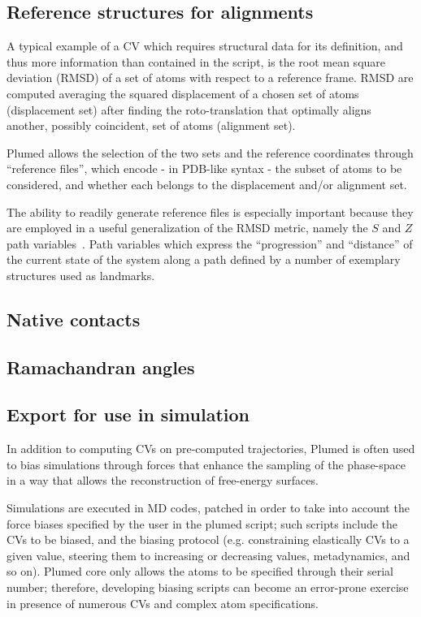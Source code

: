 \documentclass[preprint,12pt]{elsarticle}
\begin{document}
\subsection{Reference structures for alignments}

A typical example of a CV which requires structural data for its
definition, and thus more information than contained in the script, is
the root mean square deviation (RMSD) of a set of atoms with respect
to a reference frame. RMSD are computed averaging the squared
displacement of a chosen set of atoms (displacement set) after finding
the roto-translation that optimally aligns another, possibly
coincident, set of atoms (alignment set). 

Plumed allows the selection of the two sets and the reference
coordinates through ``reference files'', which encode - in PDB-like
syntax - the subset of atoms to be considered, and whether each
belongs to the displacement and/or alignment set. 

The ability to readily generate reference files is especially
important because they are employed in a useful generalization of the
RMSD metric, namely the $S$ and $Z$ path
variables~\cite{Branduardi_Gervasio_Parrinello_2007}.  Path variables
which express the ``progression'' and ``distance'' of the current
state of the system along a path defined by a number of exemplary
structures used as landmarks.



\subsection{Native contacts}




\subsection{Ramachandran angles}




\subsection{Export for use in simulation}

In addition to computing CVs on pre-computed trajectories, Plumed is
often used to bias simulations through forces that enhance the
sampling of the phase-space in a way that allows the reconstruction of
free-energy surfaces. 

Simulations are executed in MD codes, patched in order to take into
account the force biases specified by the user in the plumed script;
such scripts include the CVs to be biased, and the biasing protocol
(e.g. constraining elastically CVs to a given value, steering them to
increasing or decreasing values, metadynamics, and so on).  Plumed
core only allows the atoms to be specified through their serial
number; therefore, developing biasing scripts can become an
error-prone exercise in presence of numerous CVs and complex atom
specifications.  
\end{document}
